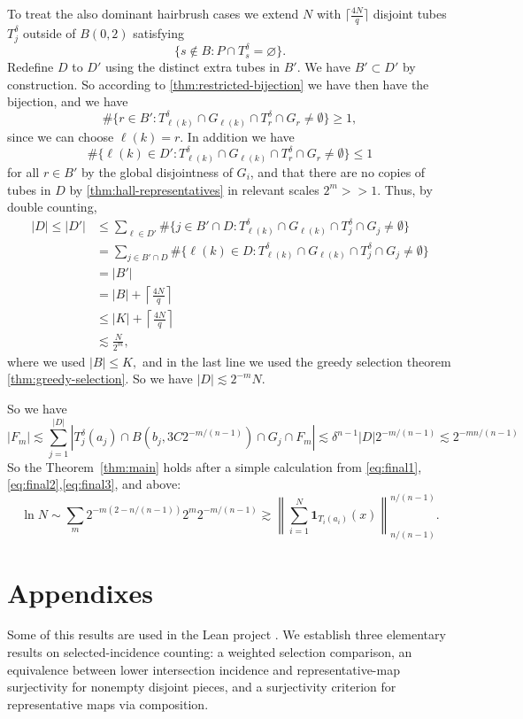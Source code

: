 \documentclass[11pt, letterpaper]{nyjm}
\begin{document}
	To treat the also dominant hairbrush cases we extend
	$N$ with $\lceil \frac{4N}{q} \rceil$  disjoint tubes $T_j^{\delta}$ outside of $B(0,2)$ satisfying 
	\[
	\{s\notin B:P\cap T_s^\delta=\varnothing\}. \]  
	Redefine $D$ to $D'$ using the distinct extra tubes in $B'$.
	We have $B' \subset D'$ by construction.
	So according to \ref{thm:restricted-bijection} we have 
	then have the bijection, and we have
	\[
	\#\{r\in B' :T_{\ell(k)}^{\delta} \cap  G_{\ell(k)} \cap T_r^{\delta} \cap G_{r} \neq \emptyset\} \geq 1, 
	\]
	since we can choose $\ell(k) = r.$
	In addition we have 
	\[
	\#\{\ell(k) \in D':T_{\ell(k)}^{\delta} \cap G_{\ell(k)} \cap T_{r}^{\delta} \cap G_{r}\neq \emptyset\} \leq 1
	\] for all $r \in B'$ by the global disjointness of $G_{i}$, and that there are no copies of tubes in $D$ by \ref{thm:hall-representatives} in relevant scales $2^m >> 1.$  
	Thus, by double counting,
	\[
	\begin{aligned}
		|D| \leq |D'|
		&\leq \sum_{\ell\in D'}
		\#\{j\in B' \cap D :T_{\ell(k)}^{\delta} \cap G_{\ell(k)} \cap T_j^{\delta} \cap G_{j} \neq \emptyset\} \\
		&=
		\sum_{j \in B' \cap D}
		\#\{\ell(k) \in D:T_{\ell(k)}^{\delta} \cap G_{\ell(k)} \cap T_{j}^{\delta} \cap G_j \neq \emptyset\} \\
		&= |B'| \\
		&= |B| + \left\lceil \frac{4N}{q} \right \rceil \\
		&\leq |K| + \left \lceil \frac{4N}{q} \right\rceil\\
		&\lesssim \frac{N}{2^m},
	\end{aligned}
	\]
	where we used $|B| \leq K,$ and 
	in the last line we used the greedy selection theorem \ref{thm:greedy-selection}. 
	So we have $|D| \lesssim 2^{-m}N.$
	
	So we have 
	\begin{equation}
		|F_m| \lesssim \sum_ {j=1}^{|D|}|T^\delta_j(a_j) \cap B(b_{j},3C2^{-m/(n-1)}) \cap G_j \cap F_m| \lesssim \delta^{n-1}|D|2^{-m/(n-1)} \lesssim 2^{-mn/(n-1)} 
	\end{equation}
	So the Theorem~\ref{thm:main} holds after a simple calculation from \eqref{eq:final1}, \eqref{eq:final2},\eqref{eq:final3}, and above:
	\[
	\ln N \sim \sum_m 2^{-m(2-n/(n-1))} 2^{m}2^{-m/(n-1)}
	\gtrsim \left\| \sum_{i=1}^{N} \mathbf{1}_{T_i(a_i)}(x)
	\right\|_{n/(n-1)}^{n/(n-1)}.
	\] 
	
	\section{Appendixes}
	\appendix
	Some of this results are used in the Lean project \cite{Aspegren2026Lean}.
	We establish three elementary results on selected-incidence counting: a weighted selection comparison, an equivalence between lower intersection incidence and representative-map surjectivity for nonempty disjoint pieces, and a surjectivity criterion for representative maps via composition. 
	
\end{document}
